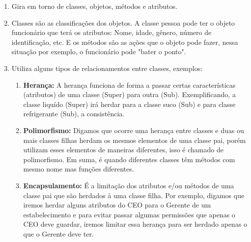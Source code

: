 \documentclass[12pt, a4paper]{article}
\begin{document}
\begin{enumerate}[label*=\textbf{\arabic*}.]
    
    \item Gira em torno de classes, objetos, métodos e atributos.
    
    \item Classes são as classificações dos objetos. A classe pessoa pode ter o objeto
funcionário que terá os atributos: Nome, idade, gênero, número de identificação, etc. E os métodos
são as ações que o objeto pode fazer, nessa situação por exemplo, o funcionário pode "bater o ponto".
    
    \item Utiliza alguns tipos de relacionamentos entre classes, exemplos:
    
    \begin{enumerate}[label*=\textbf{\arabic*}.]

        \item \textbf{Herança:} A herança funciona de forma a passar certas características (atributos)
        de uma classe (Super) para outra (Sub). Exemplificando, a classe liquído (Super)
        irá herdar para a classe suco (Sub) e para classe refrigerante (Sub), a consistência.
        
        \item \textbf{Polimorfismo:} Digamos que ocorre uma herança entre classes e duas ou mais classes filhas
        herdam os mesmos elementos de uma classe pai, porém utilizam esses elementos de maneiras diferentes,
        isso é chamado de polimorfismo. Em suma, é quando diferentes classes têm métodos com mesmo nome mas funções
        diferentes.
        
        \item \textbf{Encapsulamento: } É a limitação dos atributos e/ou métodos de uma classe pai que são herdados
        à uma classe filha. Por exemplo, digamos que iremos herdar alguns atributos do CEO para o Gerente de um 
        estabelecimento e para evitar passar algumas permissões que apenas o CEO deve guardar, iremos limitar essa herança para ser herdado apenas 
        o que o Gerente deve ter.

    \end{enumerate}

\end{enumerate}

\newpage

\vspace*{1cm}
\end{document}
